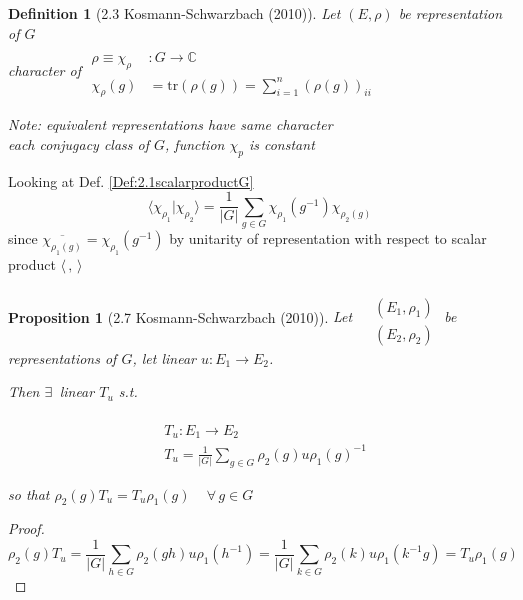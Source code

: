 \documentclass[10pt]{amsart}
\newtheorem{proposition}{Proposition}
\newtheorem{definition}{Definition}
\begin{document}
\begin{multicols*}{2}
\begin{definition}[2.3 Kosmann-Schwarzbach (2010)\cite{YKosmann-Schwarzbach2010}]
	Let $(E,\rho)$ be representation of $G$ \\
	character of $\begin{aligned} & \quad \\ 
	\rho \equiv \chi_{\rho} & : G \to \mathbb{C} \\
	\chi_{\rho}(g) & = \text{tr}( \rho(g)) = \sum_{i=1}^n (\rho(g))_{ii} \end{aligned}$ 
	
	Note: equivalent representations have same character \\
	each conjugacy class of $G$, function $\chi_p$ is constant
\end{definition}

Looking at Def. \ref{Def:2.1scalarproductG}
\[
\langle \chi_{\rho_1} | \chi_{\rho_2} \rangle = \frac{1}{|G| } \sum_{g\in G} \chi_{\rho_1}(g^{-1}) \chi_{\rho_2(g)}
\]
since $\overline{\chi_{\rho_1(g)}} = \chi_{\rho_1}(g^{-1})$ by unitarity of representation with respect to scalar product $\langle \, , \, \rangle$

\begin{proposition}[2.7 Kosmann-Schwarzbach (2010)\cite{YKosmann-Schwarzbach2010}]
	Let $\begin{aligned} & \quad \\ 
	& (E_1, \rho_1) \\
	& (E_2, \rho_2) \end{aligned}$ be representations of $G$, let linear $u: E_1 \to E_2$.  
	
	Then $\exists \, $ linear $T_u$ s.t. 
	
	\begin{equation}\label{Eq:T_ucharacters}
	\begin{aligned} & \quad \\
	& T_u : E_1 \to E_2 \\
	& T_u = \frac{1}{|G|} \sum_{g\in G} \rho_2(g)u\rho_1(g)^{-1} \end{aligned}
	\end{equation}
	
	so that $\rho_2(g) T_u = T_u\rho_1(g) \quad \, \forall \, g \in G$
\end{proposition}

\begin{proof}
	\[
	\rho_2(g) T_u = \frac{1}{|G|} \sum_{ h \in G } \rho_2(gh) u \rho_1(h^{-1}) = \frac{1}{|G|} \sum_{ k \in G} \rho_2(k) u \rho_1(k^{-1}g) = T_u \rho_1(g)
	\]
\end{proof}


\end{multicols*}
\end{document}
